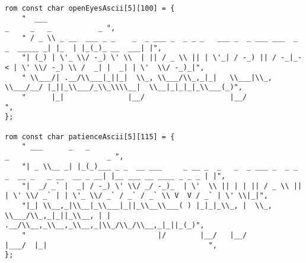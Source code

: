 \begin{lstlisting}
rom const char openEyesAscii[5][100] = {
	"  ___                                                                      _     _   _           _ ",
	" / _ \\ _ __  ___ _ _    _  _ ___ _  _ _ _   ___ _  _ ___ ___  _ _  _____ _| |_  | |_(_)_ __  ___| |",
	"| (_) | \'_ \\/ -_) \' \\  | || / _ \\ || | \'_| / -_) || / -_|_-< | \' \\/ -_) \\ /  _| |  _| | \'  \\/ -_)_|",
	" \\___/| .__/\\___|_||_|  \\_, \\___/\\_,_|_|   \\___|\\_, \\___/__/ |_||_\\___/_\\_\\\\__|  \\__|_|_|_|_\\___(_)",
	"      |_|               |__/                    |__/                                               ",
};

rom const char patienceAscii[5][115] = {
	" ___      _   _                                                                         _                       _ ",
	"| _ \\__ _| |_(_)___ _ _  __ ___     _ __ _  _   _  _ ___ _  _ _ _  __ _   _ __  __ _ __| |__ ___ __ ____ _ _ _ | |",
	"|  _/ _` |  _| / -_) \' \\/ _/ -_)_  | \'  \\ || | | || / _ \\ || | \' \\/ _` | | \'_ \\/ _` / _` / _` \\ V  V / _` | \' \\|_|",
	"|_| \\__,_|\\__|_\\___|_||_\\__\\___( ) |_|_|_\\_, |  \\_, \\___/\\_,_|_||_\\__, | | .__/\\__,_\\__,_\\__,_|\\_/\\_/\\__,_|_||_(_)",
	"                               |/        |__/   |__/              |___/  |_|                                      ",
};


\end{lstlisting}
